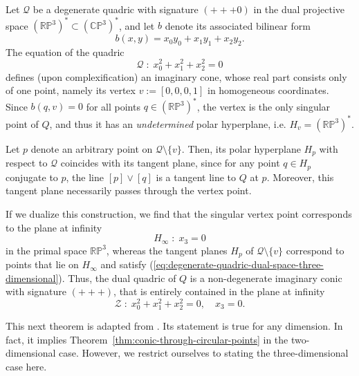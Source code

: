 \documentclass[10pt, a4paper]{article}
\theoremstyle{BoldTopSpacing}
\theoremstyle{BoldTopSpacing}
\theoremstyle{BoldTopSpacing}
\theoremstyle{BoldTopBottomSpacing}
\theoremstyle{BoldTopSpacing}
\theoremstyle{BoldTopBottomSpacing}
\theoremstyle{remark}
\begin{document}
Let $\mathcal{Q}$ be a degenerate quadric with signature $(+ + + 0)$ in the dual projective space $(\mathbb{R}\mathbb{P}^{3})^{*} \subset (\mathbb{C}\mathbb{P}^{3})^{*}$, and let $b$ denote its associated bilinear form
\[
    b(x, y) = x_{0} y_{0} + x_{1} y_{1} + x_{2} y_{2}.
\]
The equation of the quadric
\begin{equation}
\label{eq:degenerate-quadric-dual-space-three-dimensional}
    \mathcal{Q} \; : \; x_{0}^2 + x_{1}^2 + x_{2}^2 = 0
\end{equation}
defines (upon complexification) an imaginary cone, whose real part consists only of one point, namely its vertex $v := [0, 0, 0, 1]$ in homogeneous coordinates. Since $b(q, v) = 0$ for all points $q \in (\mathbb{R}\mathbb{P}^{3})^{*}$, the vertex is the only singular point of $Q$, and thus it has an \textit{undetermined} polar hyperplane, i.e. $H_{v} =  (\mathbb{R}\mathbb{P}^{3})^{*}$. \par
Let $p$ denote an arbitrary point on $\mathcal{Q} \setminus \{v\}$. Then, its polar hyperplane $H_{p}$ with respect to $\mathcal{Q}$ coincides with its tangent plane, since for any point $q \in H_{p}$ conjugate to $p$, the line $[p] \vee [q]$ is a tangent line to $Q$ at $p$. Moreover, this tangent plane necessarily passes through the vertex point. \par
If we dualize this construction, we find that the singular vertex point corresponds to the plane at infinity
\[
    H_{\infty} \; : \; x_{3} = 0
\]
in the primal space $\mathbb{R}\mathbb{P}^3$, whereas the tangent planes $H_{p}$ of $\mathcal{Q} \setminus \{v\}$ correspond to points that lie on $H_{\infty}$ and satisfy (\ref{eq:degenerate-quadric-dual-space-three-dimensional}). Thus, the dual quadric of $Q$ is a non-degenerate imaginary conic with signature $(+ + +)$, that is entirely contained in the plane at infinity
\begin{equation}
\label{absolute-conic}
\mathcal{Z} \; : \; x_{0}^2 + x_{1}^2 + x_{2}^2 = 0, \quad x_{3} = 0.
\end{equation}

This next theorem is adapted from \cite[\textcolor{CitationColor}{Ch.~10}]{alveroAnalyticProjectiveGeometry}. Its statement is true for any dimension. In fact, it implies Theorem~\ref{thm:conic-through-circular-points} in the two-dimensional case. However, we restrict ourselves to stating the three-dimensional case here. \par
\end{document}
